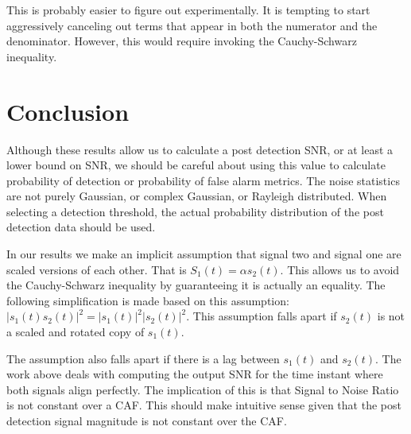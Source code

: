 \documentclass[11pt]{article}
\begin{document}







This is probably easier to figure out experimentally. It is tempting to start aggressively canceling out terms that appear in both the numerator and the denominator. However, this would require invoking the Cauchy-Schwarz inequality.

\section{Conclusion}

Although these results allow us to calculate a post detection SNR, or at least a lower bound on SNR, we should be careful about using this value to calculate probability of detection or probability of false alarm metrics. The noise statistics are not purely Gaussian, or complex Gaussian, or Rayleigh distributed. When selecting a detection threshold, the actual probability distribution of the post detection data should be used.

In our results we make an implicit assumption that signal two and signal one are scaled versions of each other. That is $S_1(t) = \alpha s_2(t)$. This allows us to avoid the Cauchy-Schwarz inequality by guaranteeing it is actually an equality. The following simplification is made based on this assumption: $|s_1(t)s_2(t)|^2 = |s_1(t)|^2|s_2(t)|^2$. This assumption falls apart if $s_2(t)$ is not a scaled and rotated copy of $s_1(t)$.

The assumption also falls apart if there is a lag between $s_1(t)$ and $s_2(t)$. The work above deals with computing the output SNR for the time instant where both signals align perfectly. The implication of this is that Signal to Noise Ratio is not constant over a CAF. This should make intuitive sense given that the post detection signal magnitude is not constant over the CAF.

\end{document}
